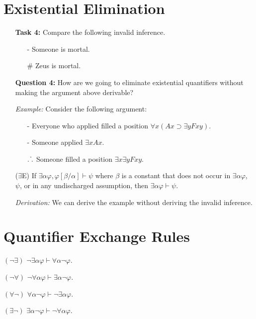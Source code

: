 \documentclass[a4paper, 11pt]{article} %
\def\therefore{\ensuremath{\ldotp\dot\,\ldotp}}
\newcommand{\qt}[2]{#1 #2} %
\newcommand{\unisub}[2]{[#1/#2]}
\begin{document}
\section*{Existential Elimination}

\begin{enumerate}
  \item[\bf Task 4:] Compare the following invalid inference.
    \begin{itemize}
      \item[-] Someone is mortal.
      \item[$\#$] Zeus is mortal.
    \end{itemize}
  \item[\bf Question 4:] How are we going to eliminate existential quantifiers without making the argument above derivable?
  \item[\it Example:] Consider the following argument:
    \begin{itemize}
      \item[-] Everyone who applied filled a position $\forall x(Ax \supset \exists y Fxy)$.
      \item[-] Someone applied $\exists xAx$.
      \item[$\therefore$] Someone filled a position $\exists x\exists y Fxy$.
    \end{itemize}
  \item[($\exists$E)] If $\exists\alpha\varphi,\varphi\unisub{\beta}{\alpha} \vdash \psi$ where $\beta$ is a constant that does not occur in $\exists\alpha\varphi$, $\psi$, or in any undischarged assumption, then $\exists\alpha\varphi\vdash \psi$.
  \item[\it Derivation:] We can derive the example without deriving the invalid inference.
\end{enumerate}



\section*{Quantifier Exchange Rules}

\begin{enumerate}
  \begin{multicols}{2}
    \item[$(\neg\exists)$] $\neg\qt{\exists}{\alpha}\varphi \vdash \qt{\forall}{\alpha}\neg\varphi$.
    \item[$(\neg\forall)$] $\neg\qt{\forall}{\alpha}\varphi \vdash \qt{\exists}{\alpha}\neg\varphi$.
    \item[$(\forall\neg)$] $\qt{\forall}{\alpha}\neg\varphi \vdash \neg\qt{\exists}{\alpha}\varphi$.
    \item[$(\exists\neg)$] $\qt{\exists}{\alpha}\neg\varphi \vdash \neg\qt{\forall}{\alpha}\varphi$.
  \end{multicols}
\end{enumerate}
\end{document}
